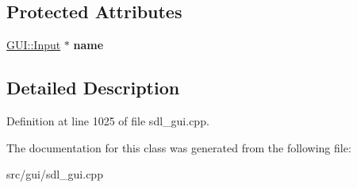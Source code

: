 \subsection*{Protected Attributes}
\begin{DoxyCompactItemize}
\item 
\hypertarget{classSetVsyncrate_a7c739c3ee8c8f232c6f753c531f88c59}{\hyperlink{classGUI_1_1Input}{G\-U\-I\-::\-Input} $\ast$ {\bfseries name}}\label{classSetVsyncrate_a7c739c3ee8c8f232c6f753c531f88c59}

\end{DoxyCompactItemize}


\subsection{Detailed Description}


Definition at line 1025 of file sdl\-\_\-gui.\-cpp.



The documentation for this class was generated from the following file\-:\begin{DoxyCompactItemize}
\item 
src/gui/sdl\-\_\-gui.\-cpp\end{DoxyCompactItemize}
